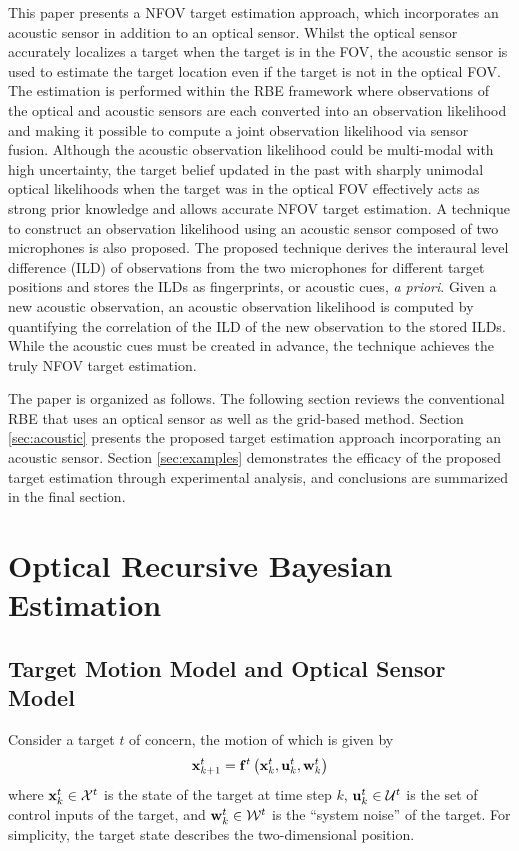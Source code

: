 This paper presents a NFOV target estimation approach, which incorporates an acoustic sensor in addition to an optical sensor.  Whilst the optical sensor accurately localizes a target when the target is in the FOV, the acoustic sensor is used to estimate the target location even if the target is not in the optical FOV.  The estimation is performed within the RBE framework where observations of the optical and acoustic sensors are each converted into an observation likelihood and making it possible to compute a joint observation likelihood via sensor fusion.  Although the acoustic observation likelihood could be multi-modal with high uncertainty, the target belief updated in the past with sharply unimodal optical likelihoods when the target was in the optical FOV effectively acts as strong prior knowledge and allows accurate NFOV target estimation.  A technique to construct an observation likelihood using an acoustic sensor composed of two microphones is also proposed.  The proposed technique derives the interaural level difference (ILD) of observations from the two microphones for different target positions and stores the ILDs as fingerprints, or acoustic cues, \textit{a priori}.  Given a new acoustic observation, an acoustic observation likelihood is computed by quantifying the correlation of the ILD of the new observation to the stored ILDs.  While the acoustic cues must be created in advance, the technique achieves the truly NFOV target estimation.   

The paper is organized as follows. The following section reviews the conventional RBE that uses an optical sensor as well as the grid-based method. Section \ref{sec:acoustic} presents the proposed target estimation approach incorporating an acoustic sensor. Section \ref{sec:examples} demonstrates the efficacy of the proposed target estimation through experimental analysis, and conclusions are summarized in the final section.

\section{Optical Recursive Bayesian Estimation}
\label{sec:Bayes}
\subsection{Target Motion Model and Optical Sensor Model}
Consider a target $t$ of concern, the motion of which is given by
\begin{equation}\label{eq:target_model}
\mathbf{x}_{k+1}^{t} = \mathbf{f}^{t} \left ( \mathbf{x}_{k}^{t}, \mathbf{u}_{k}^{t}, \mathbf{w}_{k}^{t} \right )
\end{equation}
where $\mathbf{x}_{k}^{t} \in \mathcal{X}^t$ is the state of the target at time step $k$, $\mathbf{u}_{k}^{t} \in \mathcal{U}^t$ is the set of control inputs of the target, and $\mathbf{w}_{k}^{t} \in \mathcal{W}^t$ is the ``system noise'' of the target. For simplicity, the target state describes the two-dimensional position.

